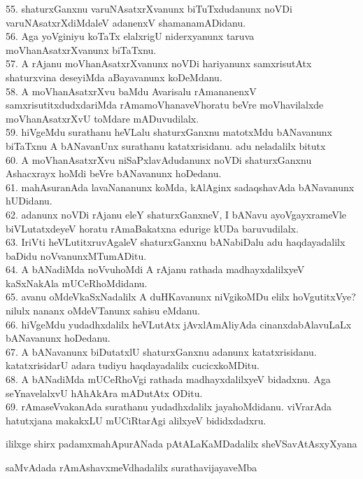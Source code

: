 \documentclass{article}
\begin{document}
55. shaturxGanxnu varuNAsatxrXvanunx biTuTxdudanunx noVDi varuNAsatxrXdiMdaleV adanenxV shamanamADidanu.\\
56. Aga yoVginiyu koTaTx elalxrigU niderxyanunx taruva moVhanAsatxrXvanunx biTaTxnu.\\
57. A rAjanu moVhanAsatxrXvanunx noVDi hariyanunx samxrisutAtx shaturxvina deseyiMda aBayavanunx koDeMdanu.\\
58. A moVhanAsatxrXvu baMdu Avarisalu rAmananenxV samxrisutitxdudxdariMda rAmamoVhanaveVhoratu beVre moVhavilalxde moVhanAsatxrXvU toMdare mADuvudilalx.\\
59. hiVgeMdu surathanu heVLalu shaturxGanxnu matotxMdu bANavanunx biTaTxnu A bANavanUnx surathanu katatxrisidanu. adu neladalilx bitutx\\
60. A moVhanAsatxrXvu niSaPxlavAdudanunx noVDi shaturxGanxnu Ashacxrayx hoMdi beVre bANavanunx hoDedanu.\\
61. mahAsuranAda lavaNananunx koMda, kAlAginx sadaqshavAda bANavanunx hUDidanu.\\
62. adanunx noVDi rAjanu eleY shaturxGanxneV, I bANavu ayoVgayxrameVle biVLutatxdeyeV horatu rAmaBakatxna edurige kUDa baruvudilalx.\\
63. IriVti heVLutitxruvAgaleV shaturxGanxnu bANabiDalu adu haqdayadalilx baDidu noVvanunxMTumADitu.\\
64. A bANadiMda noVvuhoMdi A rAjanu rathada madhayxdalilxyeV kaSxNakAla mUCeRhoMdidanu.\\
65. avanu oMdeVkaSxNadalilx A duHKavanunx niVgikoMDu elilx hoVgutitxVye? nilulx nananx oMdeVTanunx sahisu eMdanu.\\
66. hiVgeMdu yudadhxdalilx heVLutAtx jAvxlAmAliyAda cinanxdabAlavuLaLx bANavanunx hoDedanu.\\
67. A bANavanunx biDutatxlU shaturxGanxnu adanunx katatxrisidanu. katatxrisidarU adara tudiyu haqdayadalilx cucicxkoMDitu.\\
68. A bANadiMda mUCeRhoVgi rathada madhayxdalilxyeV bidadxnu. Aga seYnavelalxvU hAhAkAra mADutAtx ODitu.\\
69. rAmaseVvakanAda surathanu yudadhxdalilx jayahoMdidanu. viVrarAda hatutxjana makakxLU mUCiRtarAgi alilxyeV bididxdadxru.

\begin{center}
ililxge shirx padamxmahApurANada pAtALaKaMDadalilx sheVSavAtAsxyXyana
\end{center}

\begin{center}
saMvAdada rAmAshavxmeVdhadalilx surathavijayaveMba
\end{center}
\end{document}
